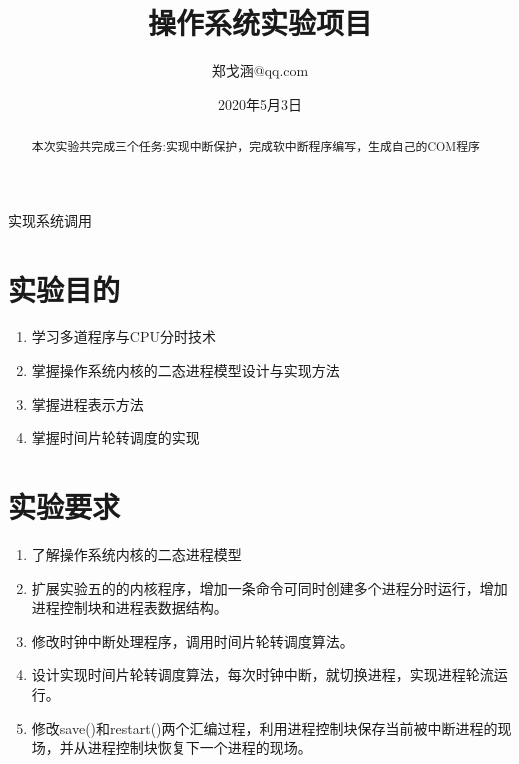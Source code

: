 \documentclass[a4paper, 11pt]{article} %
\title{\textbf{操作系统实验项目}\\ %
} %
\author{郑戈涵\quad 17338233\quad 931252924@qq.com} %
\date{2020年5月3日} %
\makeatletter
\renewcommand{\maketitle}{ %
\begin{center} %
{\LARGE\@title} %

\large{\@subtitle}

\vspace{1em} %

{\large\@author} %

\end{center}
}
\newcommand\@subtitle{实现系统调用}
\makeatother
\begin{document}
\maketitle %


\renewcommand{\abstractname}{摘要} %

\begin{abstract}
  本次实验共完成三个任务:实现中断保护，完成软中断程序编写，生成自己的COM程序
\end{abstract}


\vspace{1em} %

\setcounter{tocdepth}{2}
\renewcommand{\contentsname}{目录}
\tableofcontents


\pagebreak

\section{实验目的}

\begin{enumerate}
  \item 学习多道程序与CPU分时技术
  \item 掌握操作系统内核的二态进程模型设计与实现方法
  \item 掌握进程表示方法
  \item 掌握时间片轮转调度的实现
\end{enumerate}


\section{实验要求}

\begin{enumerate}
  \item 了解操作系统内核的二态进程模型
  \item 扩展实验五的的内核程序，增加一条命令可同时创建多个进程分时运行，增加进程控制块和进程表数据结构。
  \item 修改时钟中断处理程序，调用时间片轮转调度算法。
  \item 设计实现时间片轮转调度算法，每次时钟中断，就切换进程，实现进程轮流运行。
  \item 修改save()和restart()两个汇编过程，利用进程控制块保存当前被中断进程的现场，并从进程控制块恢复下一个进程的现场。
\end{enumerate}
\end{document}
